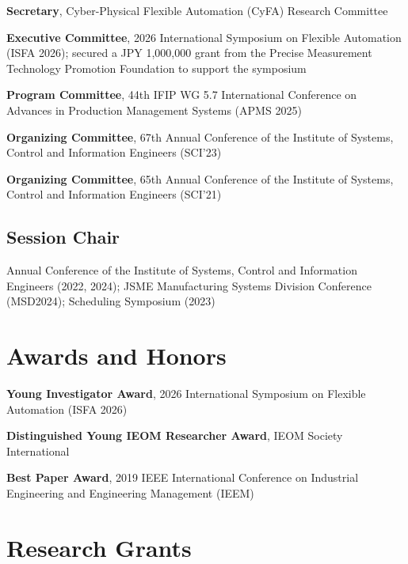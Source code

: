 \documentclass[11pt,a4paper]{article}
\newlength{\datecol}
\newenvironment{cvlist}{%
  \begin{list}{}{%
    \setlength{\leftmargin}{\datecol}%
    \setlength{\labelwidth}{\datecol}%
    \setlength{\labelsep}{0pt}%
    \setlength{\itemsep}{3pt}%
    \setlength{\parsep}{0pt}%
    \setlength{\topsep}{2pt}%
    \renewcommand{\makelabel}[1]{##1\hfil}}%
  \raggedright}%
  {\end{list}}
\begin{document}
\begin{cvlist}
\item[2021--] \textbf{Secretary}, Cyber-Physical Flexible Automation (CyFA)
  Research Committee
\item[2026] \textbf{Executive Committee}, 2026 International Symposium on
  Flexible Automation (ISFA 2026); secured a JPY 1,000,000 grant from the
  Precise Measurement Technology Promotion Foundation to support the symposium
\item[2025] \textbf{Program Committee}, 44th IFIP WG 5.7 International
  Conference on Advances in Production Management Systems (APMS 2025)
\item[2023] \textbf{Organizing Committee}, 67th Annual Conference of the
  Institute of Systems, Control and Information Engineers (SCI'23)
\item[2021] \textbf{Organizing Committee}, 65th Annual Conference of the
  Institute of Systems, Control and Information Engineers (SCI'21)
\end{cvlist}

\subsection*{Session Chair}

\begin{cvlist}
\item[] Annual Conference of the Institute of Systems, Control and Information
  Engineers (2022, 2024); JSME Manufacturing Systems Division Conference
  (MSD2024); Scheduling Symposium (2023)
\end{cvlist}

\section{Awards and Honors}

\begin{cvlist}
\item[2026] \textbf{Young Investigator Award}, 2026 International Symposium on
  Flexible Automation (ISFA 2026)
\item[2024] \textbf{Distinguished Young IEOM Researcher Award}, IEOM Society
  International
\item[2019] \textbf{Best Paper Award}, 2019 IEEE International Conference on
  Industrial Engineering and Engineering Management (IEEM)
\end{cvlist}

\section{Research Grants}
\end{document}
